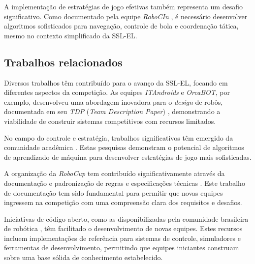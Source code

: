 A implementação de estratégias de jogo efetivas também representa um desafio significativo. Como documentado pela equipe \textit{RoboCIn} \cite{robocin_tdp_2024}, é necessário desenvolver algoritmos sofisticados para navegação, controle de bola e coordenação tática, mesmo no contexto simplificado da SSL-EL.

\subsection{Trabalhos relacionados}
\label{subsec:futebol_trabalhos}

Diversos trabalhos têm contribuído para o avanço da SSL-EL, focando em diferentes aspectos da competição. As equipes \textit{ITAndroids} e \textit{OrcaBOT}, por exemplo, desenvolveu uma abordagem inovadora para o \textit{design} de robôs, documentada em seu \textit{TDP} (\textit{Team Description Paper}) \cite{orcabot_tdp_2024, itandroids_tdp_2023}, demonstrando a viabilidade de construir sistemas competitivos com recursos limitados.

No campo do controle e estratégia, trabalhos significativos têm emergido da comunidade acadêmica \cite{bruno_brandao, robocin_trabalho}. Estas pesquisas demonstram o potencial de algoritmos de aprendizado de máquina para desenvolver estratégias de jogo mais sofisticadas.

A organização da \textit{RoboCup} tem contribuído significativamente através da documentação e padronização de regras e especificações técnicas \cite{regras_ssl_el_2024}. Este trabalho de documentação tem sido fundamental para permitir que novas equipes ingressem na competição com uma compreensão clara dos requisitos e desafios.

Iniciativas de código aberto, como as disponibilizadas pela comunidade brasileira de robótica \cite{robocup_ssl_brasil}, têm facilitado o desenvolvimento de novas equipes. Estes recursos incluem implementações de referência para sistemas de controle, simuladores e ferramentas de desenvolvimento, permitindo que equipes iniciantes construam sobre uma base sólida de conhecimento estabelecido.